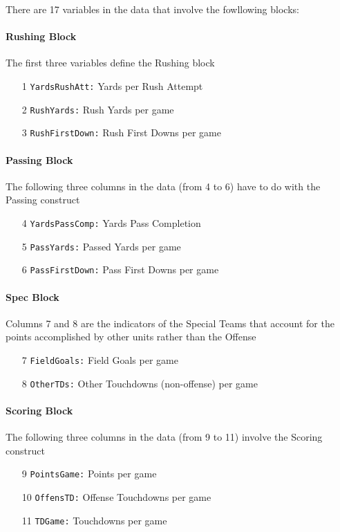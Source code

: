 \documentclass[12pt]{book}\usepackage{graphicx, color}
\newcommand{\code}[1]{\texttt{#1}}
\begin{document}
There are 17 variables in the data that involve the fowllowing blocks:

\paragraph{Rushing Block} The first three variables define the Rushing block
\begin{enumerate}
 \item[1] \code{YardsRushAtt:} Yards per Rush Attempt
 \item[2] \code{RushYards:} Rush Yards per game
 \item[3] \code{RushFirstDown:} Rush First Downs per game
\end{enumerate}

\paragraph{Passing Block} The following three columns in the data (from 4 to 6) have to do with the Passing construct
\begin{enumerate}
 \item[4] \code{YardsPassComp:} Yards Pass Completion
 \item[5] \code{PassYards:} Passed Yards per game
 \item[6] \code{PassFirstDown:} Pass First Downs per game
\end{enumerate}

\paragraph{Spec Block} Columns 7 and 8 are the indicators of the Special Teams that account for the points accomplished by other units rather than the Offense
\begin{enumerate}
 \item[7] \code{FieldGoals:} Field Goals per game
 \item[8] \code{OtherTDs:} Other Touchdowns (non-offense) per game
\end{enumerate}

\paragraph{Scoring Block} The following three columns in the data (from 9 to 11) involve the Scoring construct
\begin{enumerate}
 \item[9] \code{PointsGame:} Points per game
 \item[10] \code{OffensTD:} Offense Touchdowns per game
 \item[11] \code{TDGame:} Touchdowns per game
\end{enumerate}
\end{document}
